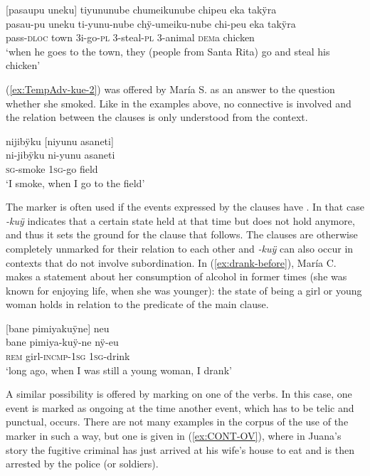 \ea\label{ex:chicken-steal}
\begingl
\glpreamble \textup{[}pasaupu uneku\textup{]} tiyununube chumeikunube chipeu eka takÿra\\
\gla pasau-pu uneku ti-yunu-nube chÿ-umeiku-nube chi-peu eka takÿra\\
\glb pass-\textsc{dloc} town 3i-go-\textsc{pl} 3-steal-\textsc{pl} 3-animal \textsc{dem}a chicken\\
\glft ‘when he goes to the town, they (people from Santa Rita) go and steal his chicken’
\endgl
\trailingcitation{[jxx-p120515l-2.254]}
\xe

(\ref{ex:TempAdv-kue-2}) was offered by María S. as an answer to the question whether she smoked. Like in the examples above, no connective is involved and the relation between the clauses is only understood from the context.


\ea\label{ex:TempAdv-kue-2}
\begingl
\glpreamble nijibÿku \textup{[}niyunu asaneti\textup{]}\\
\gla ni-jibÿku ni-yunu asaneti\\
\textsc{sg}-smoke 1\textsc{sg}-go field\\
\glft ‘I smoke, when I go to the field’
\endgl
\trailingcitation{[rxx-e120511l.390]}%
\xe

The  marker is often used if the events expressed by the clauses have . In that case \textit{-kuÿ} indicates that a certain state held at that time but does not hold anymore, and thus it sets the ground for the clause that follows. The clauses are otherwise completely unmarked for their relation to each other and \textit{-kuÿ} can also occur in contexts that do not involve subordination. In (\ref{ex:drank-before}), María C. makes a statement about her consumption of alcohol in former times (she was known for enjoying life, when she was younger): the state of being a girl or young woman holds in relation to the predicate of the main clause.

\ea\label{ex:drank-before}
\begingl
\glpreamble \textup{[}bane pimiyakuÿne\textup{]} neu\\
\gla bane pimiya-kuÿ-ne nÿ-eu\\
\glb \textsc{rem} girl-\textsc{incmp}-1\textsc{sg} 1\textsc{sg}-drink\\
\glft ‘long ago, when I was still a young woman, I drank’
\endgl
\trailingcitation{[cux-c120414ls-1.031]}
\xe

A similar possibility is offered by  marking on one of the verbs. In this case, one event is marked as ongoing at the time another event, which has to be telic and punctual, occurs. There are not many examples in the corpus of the use of the  marker in such a way, but one is given in (\ref{ex:CONT-OV}), where in Juana’s story the fugitive criminal has just arrived at his wife’s house to eat and is then arrested by the police (or soldiers).

